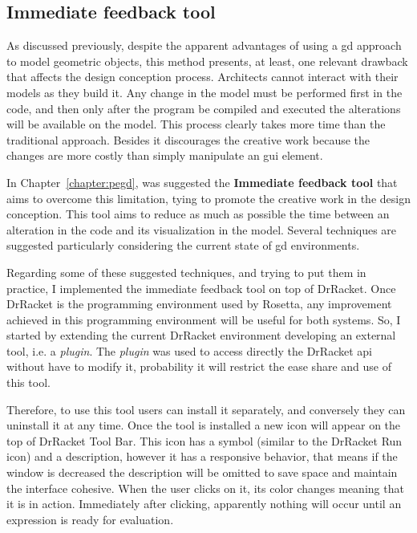 \subsection{Immediate feedback tool}

As discussed previously, despite the apparent advantages of using a \gls{gd} approach to model geometric objects, this method presents, at least, one relevant drawback that affects the design conception process. Architects cannot interact with their models as they build it. Any change in the model must be performed first in the code, and then only after the program be compiled and executed the alterations will be available on the model. This process clearly takes more time than the traditional approach. Besides it discourages the creative work because the changes are more costly than simply manipulate an \gls{gui} element.

In Chapter~\ref{chapter:pegd}, was suggested the \textbf{Immediate feedback tool} that aims to overcome this limitation, tying to promote the creative work in the design conception. This tool aims to reduce as much as possible the time between an alteration in the code and its visualization in the model. Several techniques are suggested particularly considering the current state of \gls{gd} environments.

Regarding some of these suggested techniques, and trying to put them in practice, I implemented the immediate feedback tool on top of DrRacket. Once DrRacket is the programming environment used by Rosetta, any improvement achieved in this programming environment will be useful for both systems. So, I started by extending the current DrRacket environment developing an external tool, i.e. a \textit{\textit{plugin}}. The \textit{\textit{plugin}} was used to access directly the DrRacket \gls{api} without have to modify it, probability it will  restrict the ease share and use of this tool.

Therefore, to use this tool users can install it separately, and conversely they can uninstall it at any time. Once the tool is installed a new icon will appear on the top of DrRacket Tool Bar. This icon has a symbol (similar to the DrRacket Run icon) and a description, however it has a responsive behavior, that means if the window is decreased the description will be omitted to save space and maintain the interface cohesive. When the user clicks on it, its color changes meaning that it is in action. Immediately after clicking, apparently nothing will occur until an expression is ready for evaluation.

